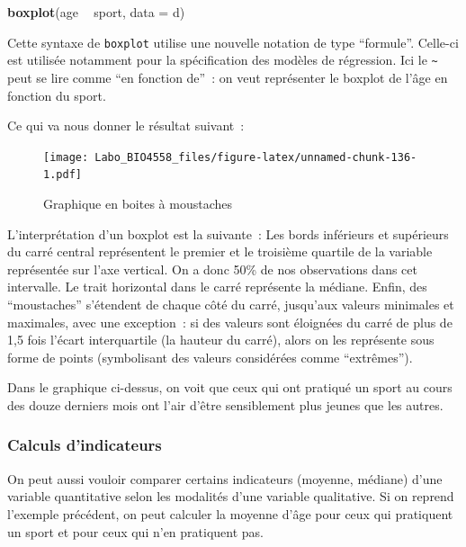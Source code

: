 \documentclass[12pt,]{book}
\makeatletter
\newenvironment{Shaded}{\begin{snugshade}}{\end{snugshade}}
\newcommand{\DataTypeTok}[1]{\textcolor[rgb]{0.27,0.27,0.27}{#1}}
\newcommand{\KeywordTok}[1]{\textcolor[rgb]{0.27,0.27,0.27}{\textbf{#1}}}
\newcommand{\NormalTok}[1]{#1}
\newcommand{\OperatorTok}[1]{\textcolor[rgb]{0.43,0.43,0.43}{\textbf{#1}}}
\newcommand{\StringTok}[1]{\textcolor[rgb]{0.5,0.5,0.5}{#1}}
\newenvironment{kframe}{%
\medskip{}
\setlength{\fboxsep}{.8em}
 \def\at@end@of@kframe{}%
 \ifinner\ifhmode%
  \def\at@end@of@kframe{\end{minipage}}%
  \begin{minipage}{\columnwidth}%
 \fi\fi%
 \def\FrameCommand##1{\hskip\@totalleftmargin \hskip-\fboxsep
 \colorbox{shadecolor}{##1}\hskip-\fboxsep
     \hskip-\linewidth \hskip-\@totalleftmargin \hskip\columnwidth}%
 \MakeFramed {\advance\hsize-\width
   \@totalleftmargin\z@ \linewidth\hsize
   \@setminipage}}%
 {\par\unskip\endMakeFramed%
 \at@end@of@kframe}
\newenvironment{rmdblock}[1]
  {
  \begin{itemize}
  \renewcommand{\labelitemi}{
    \raisebox{-.7\height}[0pt][0pt]{
      {\setkeys{Gin}{width=3em,keepaspectratio}\texttt{[image: images/\#1]}}
    }
  }
  \setlength{\fboxsep}{1em}
  \begin{kframe}
  \item
  }
  {
  \end{kframe}
  \end{itemize}
  }
\newenvironment{rmdnote}
  {\begin{rmdblock}{note}}
  {\end{rmdblock}}
\makeatother
\begin{document}
\begin{Shaded}
\begin{Highlighting}[]
\KeywordTok{boxplot}\NormalTok{(age }\OperatorTok{~}\StringTok{ }\NormalTok{sport, }\DataTypeTok{data =}\NormalTok{ d)}
\end{Highlighting}
\end{Shaded}

\begin{rmdnote}
Cette syntaxe de \texttt{boxplot} utilise une nouvelle notation de type
``formule''. Celle-ci est utilisée notamment pour la spécification des
modèles de régression. Ici le \texttt{\textasciitilde{}} peut se lire
comme ``en fonction de''~: on veut représenter le boxplot de l'âge en
fonction du sport.
\end{rmdnote}

Ce qui va nous donner le résultat suivant~:

\begin{figure}
\centering
\texttt{[image: Labo\_BIO4558\_files/figure-latex/unnamed-chunk-136-1.pdf]}
\caption{\label{fig:unnamed-chunk-136}Graphique en boites à moustaches}
\end{figure}

\begin{rmdnote}
L'interprétation d'un boxplot est la suivante~: Les bords inférieurs et
supérieurs du carré central représentent le premier et le troisième
quartile de la variable représentée sur l'axe vertical. On a donc 50\%
de nos observations dans cet intervalle. Le trait horizontal dans le
carré représente la médiane. Enfin, des ``moustaches'' s'étendent de
chaque côté du carré, jusqu'aux valeurs minimales et maximales, avec une
exception~: si des valeurs sont éloignées du carré de plus de 1,5 fois
l'écart interquartile (la hauteur du carré), alors on les représente
sous forme de points (symbolisant des valeurs considérées comme
``extrêmes'').
\end{rmdnote}

Dans le graphique ci-dessus, on voit que ceux qui ont pratiqué un sport au cours des douze derniers mois ont l'air d'être sensiblement plus jeunes que les autres.

\hypertarget{calculs-dindicateurs}{%
\subsubsection{Calculs d'indicateurs}\label{calculs-dindicateurs}}

On peut aussi vouloir comparer certains indicateurs (moyenne, médiane) d'une variable quantitative selon les modalités d'une variable qualitative. Si on reprend l'exemple précédent, on peut calculer la moyenne d'âge pour ceux qui pratiquent un sport et pour ceux qui n'en pratiquent pas.
\end{document}
